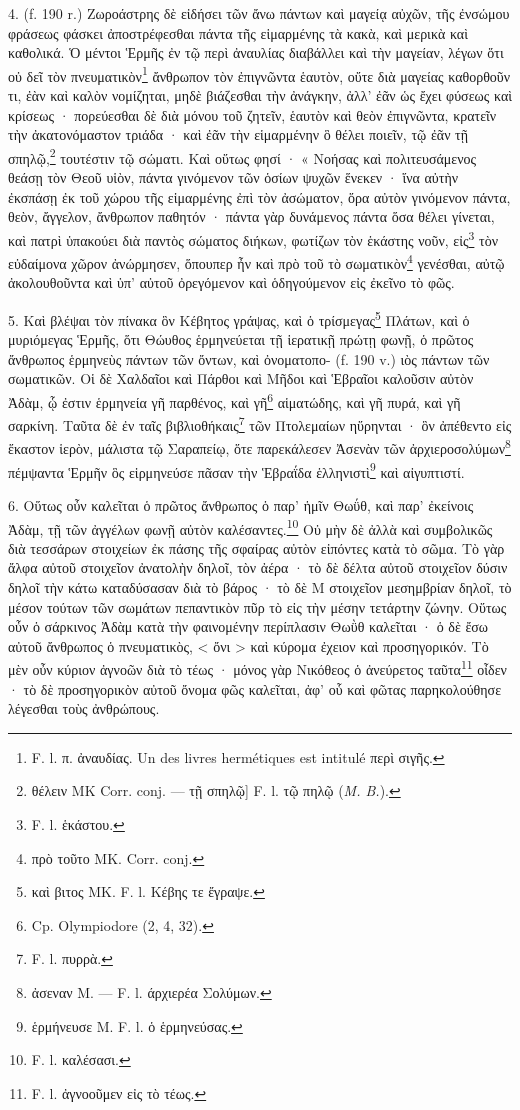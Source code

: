 \documentclass[landscape, a4paper, 11pt, oneside, polutonikogreek, french]{article}
\begin{document}
4. (f. 190 r.) Ζωροάστρης δὲ εἰδήσει τῶν ἄνω πάντων καὶ μαγείᾳ αὐχῶν, τῆς ἐνσώμου φράσεως φάσκει ἀποστρέφεσθαι πάντα τῆς εἱμαρμένης τὰ κακὰ, καὶ μερικὰ καὶ καθολικά. Ὁ μέντοι Ἑρμῆς ἐν τῷ περὶ ἀναυλίας διαβάλλει καὶ τὴν μαγείαν, λέγων ὅτι οὐ δεῖ τὸν πνευματικὸν\footnote{F. l. π. ἀναυδίας. Un des livres hermétiques est intitulé περὶ σιγῆς.} ἄνθρωπον τὸν ἐπιγνῶντα ἑαυτὸν, οὔτε διὰ μαγείας καθορθοῦν τι, ἐὰν καὶ καλὸν νομίζηται, μηδὲ βιάζεσθαι τὴν ἀνάγκην, ἀλλ' ἐᾶν ὡς ἔχει φύσεως καὶ κρίσεως · πορεύεσθαι δὲ διὰ μόνου τοῦ ζητεῖν, ἑαυτὸν καὶ θεὸν ἐπιγνῶντα, κρατεῖν τὴν ἀκατονόμαστον τριάδα · καὶ ἐᾶν τὴν εἱμαρμένην ὃ θέλει ποιεῖν, τῷ ἐᾶν τῇ σπηλῷ,\footnote{θέλειν MK Corr. conj. --- τῇ σπηλῷ] F. l. τῷ πηλῷ (\emph{M. B.}).} τουτέστιν τῷ σώματι. Καὶ οὕτως φησί · « Νοήσας καὶ πολιτευσάμενος θεάσῃ τὸν Θεοῦ υἱὸν, πάντα γινόμενον τῶν ὁσίων ψυχῶν ἕνεκεν · ἵνα αὐτὴν ἐκσπάσῃ ἐκ τοῦ χώρου τῆς εἱμαρμένης ἐπὶ τὸν ἀσώματον, ὅρα αὐτὸν γινόμενον πάντα, θεὸν, ἄγγελον, ἄνθρωπον παθητόν · πάντα γὰρ δυνάμενος πάντα ὅσα θέλει γίνεται, καὶ πατρὶ ὑπακούει διὰ παντὸς σώματος διήκων, φωτίζων τὸν ἑκάστης νοῦν, εἰς\footnote{F. l. ἑκάστου.} τὸν εὐδαίμονα χῶρον ἀνώρμησεν, ὅπουπερ ἦν καὶ πρὸ τοῦ τὸ σωματικὸν\footnote{πρὸ τοῦτο MK. Corr. conj.} γενέσθαι, αὐτῷ ἀκολουθοῦντα καὶ ὑπ' αὐτοῦ ὀρεγόμενον καὶ ὁδηγούμενον εἰς ἐκεῖνο τὸ φῶς.

5. Καὶ βλέψαι τὸν πίνακα ὃν Κέβητος γράψας, καὶ ὁ τρίσμεγας\footnote{καὶ βιτος MK. F. l. Kέβης τε ἔγραψε.} Πλάτων, καὶ ὁ μυριόμεγας Ἑρμῆς, ὅτι Θώυθος ἑρμηνεύεται τῇ ἱερατικῇ πρώτῃ φωνῇ, ὁ πρῶτος ἄνθρωπος ἑρμηνεὺς πάντων τῶν ὄντων, καὶ ὀνοματοπο- (f. 190 v.) ιὸς πάντων τῶν σωματικῶν. Οἱ δὲ Χαλδαῖοι καὶ Πάρθοι καὶ Μῆδοι καὶ Ἑβραῖοι καλοῦσιν αὐτὸν Ἀδὰμ, ᾧ ἐστιν ἑρμηνεία γῆ παρθένος, καὶ γῆ\footnote{Cp. Olympiodore (2, 4, 32).} αἱματώδης, καὶ γῆ πυρά, καὶ γῆ σαρκίνη. Ταῦτα δὲ ἐν ταῖς βιβλιοθήκαις\footnote{F. l. πυρρὰ.} τῶν Πτολεμαίων ηὕρηνται · ὃν ἀπέθεντο εἰς ἕκαστον ἱερὸν, μάλιστα τῷ Σαραπείῳ, ὅτε παρεκάλεσεν Ἀσενὰν τῶν ἀρχιεροσολύμων\footnote{ἀσεναν M. --- F. l. άρχιερέα Σολύμων.} πέμψαντα Ἑρμῆν ὃς εἱρμηνεύσε πᾶσαν τὴν Ἑβραΐδα ἑλληνιστὶ\footnote{ἑρμήνευσε M. F. l. ὁ ἑρμηνεύσας.} καὶ αἰγυπτιστί.

6. Οὕτως οὖν καλεῖται ὁ πρῶτος ἄνθρωπος ὁ παρ' ἡμῖν Θωΰθ, καὶ παρ' ἐκείνοις Ἀδὰμ, τῇ τῶν ἀγγέλων φωνῇ αὐτὸν καλέσαντες.\footnote{F. l. καλέσασι.} Οὐ μὴν δὲ ἀλλὰ καὶ συμβολικῶς διὰ τεσσάρων στοιχείων ἐκ πάσης τῆς σφαίρας αὐτὸν εἰπόντες κατὰ τὸ σῶμα. Τὸ γὰρ ἄλφα αὐτοῦ στοιχεῖον ἀνατολὴν δηλοῖ, τὸν ἀέρα · τὸ δὲ δέλτα αὐτοῦ στοιχεῖον δύσιν δηλοῖ τὴν κάτω καταδύσασαν διὰ τὸ βάρος · τὸ δὲ Μ στοιχεῖον μεσημβρίαν δηλοῖ, τὸ μέσον τούτων τῶν σωμάτων πεπαντικὸν πῦρ τὸ εἰς τὴν μέσην τετάρτην ζώνην. Οὕτως οὖν ὁ σάρκινος Ἀδὰμ κατὰ τὴν φαινομένην περίπλασιν Θωῢθ καλεῖται · ὁ δὲ ἔσω αὐτοῦ ἄνθρωπος ὁ πνευματικὸς, < ὄνι > καὶ κύρομα ἐχειον καὶ προσηγορικόν. Τὸ μὲν οὖν κύριον ἀγνοῶν διὰ τὸ τέως · μόνος γὰρ Νικόθεος ὁ ἀνεύρετος ταῦτα\footnote{F. l. ἀγνοοῦμεν εἰς τὸ τέως.} οἶδεν · τὸ δὲ προσηγορικὸν αὐτοῦ ὄνομα φῶς καλεῖται, ἀφ' οὗ καὶ φῶτας παρηκολούθησε λέγεσθαι τοὺς ἀνθρώπους.
\end{document}
